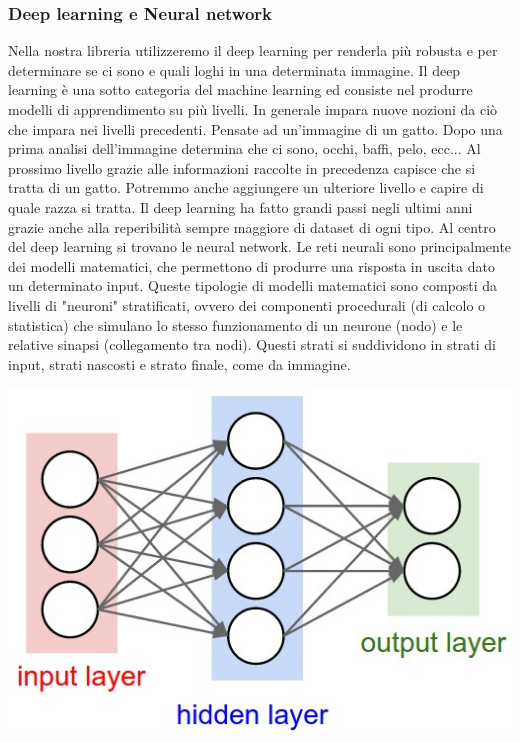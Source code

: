 \documentclass[twoside]{supsistudent}
\begin{document}
    \subsubsection{Deep learning e Neural network}
    Nella nostra libreria utilizzeremo il deep learning per renderla più robusta e per determinare se ci sono e quali loghi in una determinata immagine. Il deep learning è una sotto categoria del machine learning ed consiste nel produrre modelli di apprendimento su più livelli. 
    In generale impara nuove nozioni da ciò che impara nei livelli precedenti. Pensate ad un'immagine di un gatto. Dopo una prima analisi dell'immagine determina che ci sono, occhi, baffi, pelo, ecc... Al prossimo livello grazie alle informazioni raccolte in precedenza capisce che si tratta di un gatto. Potremmo anche aggiungere un ulteriore livello e capire di quale razza si tratta. Il deep learning ha fatto grandi passi negli ultimi anni grazie anche alla reperibilità sempre maggiore di dataset di ogni tipo. Al centro del deep learning si trovano le neural network. 
    Le reti neurali sono principalmente dei modelli matematici, che permettono di produrre una risposta in uscita dato un determinato input.
Queste tipologie di modelli matematici sono composti da livelli di "neuroni" stratificati, ovvero dei componenti procedurali (di calcolo o statistica) che simulano lo stesso funzionamento di un neurone (nodo) e le relative sinapsi (collegamento tra nodi). Questi strati si suddividono in strati di input, strati nascosti e strato finale, come da immagine.

\includegraphics[width=\textwidth]{Pictures/neural_net.jpeg}
\end{document}
